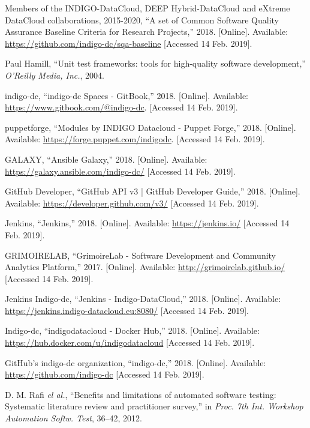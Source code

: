 \begin{thebibliography}{1}
Members of the INDIGO-DataCloud, DEEP Hybrid-DataCloud and eXtreme DataCloud collaborations, 2015-2020,
``A set of Common Software Quality Assurance Baseline Criteria for Research Projects,''
2018.
[Online]. Available: \url{https://github.com/indigo-dc/sqa-baseline}
[Accessed 14 Feb. 2019].

Paul Hamill,
``Unit test frameworks: tools for high-quality software development,''
\emph{O'Reilly Media, Inc.},
2004.


indigo-dc, ``indigo-dc Spaces - GitBook,''
2018.
[Online]. Available: \url{https://www.gitbook.com/@indigo-dc}.
[Accessed 14 Feb. 2019].

puppetforge, ``Modules by INDIGO Datacloud - Puppet Forge,''
2018.
[Online]. Available: \url{https://forge.puppet.com/indigodc}.
[Accessed 14 Feb. 2019].

GALAXY, ``Ansible Galaxy,''
2018.
[Online]. Available: \url{https://galaxy.ansible.com/indigo-dc/}
[Accessed 14 Feb. 2019].

GitHub Developer, ``GitHub API v3 | GitHub Developer Guide,''
2018.
[Online]. Available: \url{https://developer.github.com/v3/}
[Accessed 14 Feb. 2019].


Jenkins, ``Jenkins,''
2018.
[Online]. Available: \url{https://jenkins.io/}
[Accessed 14 Feb. 2019].

GRIMOIRELAB, ``GrimoireLab - Software Development and Community Analytics Platform,''
2017.
[Online]. Available: \url{http://grimoirelab.github.io/}
[Accessed 14 Feb. 2019].

Jenkins Indigo-dc, ``Jenkins - Indigo-DataCloud,''
2018.
[Online]. Available: \url{https://jenkins.indigo-datacloud.eu:8080/}
[Accessed 14 Feb. 2019].

Indigo-dc, ``indigodatacloud - Docker Hub,''
2018.
[Online]. Available: \url{https://hub.docker.com/u/indigodatacloud}
[Accessed 14 Feb. 2019].

GitHub's indigo-dc organization, ``indigo-dc,''
2018.
[Online]. Available: \url{https://github.com/indigo-dc}
[Accessed 14 Feb. 2019].

D. M. Rafi \emph{el al.},
``Benefits and limitations of automated software testing: Systematic literature review and practitioner survey,''
in \emph{Proc. 7th Int. Workshop Automation Softw. Test},
36--42, 2012.



\end{thebibliography}
